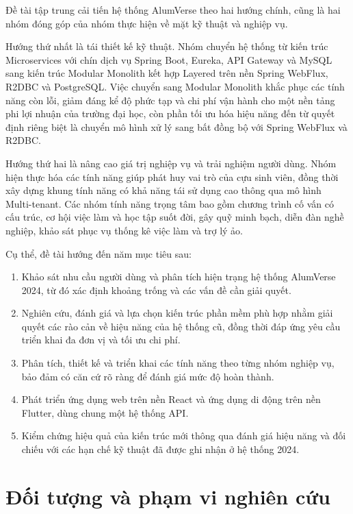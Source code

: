 \documentclass[12pt,a4paper,oneside]{report}
\begin{document}
Đề tài tập trung cải tiến hệ thống AlumVerse theo hai hướng chính, cũng là hai nhóm đóng góp của nhóm thực hiện về mặt kỹ thuật và nghiệp vụ.

Hướng thứ nhất là tái thiết kế kỹ thuật. Nhóm chuyển hệ thống từ kiến trúc Microservices với chín dịch vụ Spring Boot, Eureka, API Gateway và MySQL sang kiến trúc Modular Monolith kết hợp Layered trên nền Spring WebFlux, R2DBC và PostgreSQL. Việc chuyển sang Modular Monolith khắc phục các tính năng còn lỗi, giảm đáng kể độ phức tạp và chi phí vận hành cho một nền tảng phi lợi nhuận của trường đại học, còn phần tối ưu hóa hiệu năng đến từ quyết định riêng biệt là chuyển mô hình xử lý sang bất đồng bộ với Spring WebFlux và R2DBC.

Hướng thứ hai là nâng cao giá trị nghiệp vụ và trải nghiệm người dùng. Nhóm hiện thực hóa các tính năng giúp phát huy vai trò của cựu sinh viên, đồng thời xây dựng khung tính năng có khả năng tái sử dụng cao thông qua mô hình Multi-tenant. Các nhóm tính năng trọng tâm bao gồm chương trình cố vấn có cấu trúc, cơ hội việc làm và học tập suốt đời, gây quỹ minh bạch, diễn đàn nghề nghiệp, khảo sát phục vụ thống kê việc làm và trợ lý ảo.

Cụ thể, đề tài hướng đến năm mục tiêu sau:

\begin{enumerate}[label=(\arabic*),leftmargin=1.4cm,itemsep=2pt]
\item Khảo sát nhu cầu người dùng và phân tích hiện trạng hệ thống AlumVerse 2024, từ đó xác định khoảng trống và các vấn đề cần giải quyết.
\item Nghiên cứu, đánh giá và lựa chọn kiến trúc phần mềm phù hợp nhằm giải quyết các rào cản về hiệu năng của hệ thống cũ, đồng thời đáp ứng yêu cầu triển khai đa đơn vị và tối ưu chi phí.
\item Phân tích, thiết kế và triển khai các tính năng theo từng nhóm nghiệp vụ, bảo đảm có căn cứ rõ ràng để đánh giá mức độ hoàn thành.
\item Phát triển ứng dụng web trên nền React và ứng dụng di động trên nền Flutter, dùng chung một hệ thống API.
\item Kiểm chứng hiệu quả của kiến trúc mới thông qua đánh giá hiệu năng và đối chiếu với các hạn chế kỹ thuật đã được ghi nhận ở hệ thống 2024.
\end{enumerate}

\section{Đối tượng và phạm vi nghiên cứu}
\end{document}
